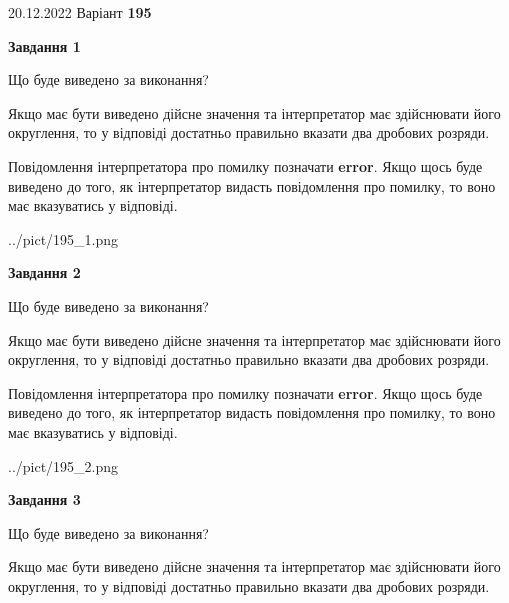 \documentclass[12pt, ukrainian]{article}
\begin{document}
{20.12.2022 Варіант \No \textbf { 195 }\par}
{
\begin {Large}

{\begin {center}\textbf{Завдання 1}\end {center}}\par
Що буде виведено за виконання? \par

Якщо має бути виведено дійсне значення та інтерпретатор має здійснювати його округлення, 
то у відповіді достатньо правильно вказати два дробових розряди.

Повідомлення інтерпретатора про помилку позначати \textbf{error}.
Якщо щось буде виведено до того, як інтерпретатор видасть повідомлення про помилку, 
то воно має вказуватись у відповіді. \par

\begin{center}
	{../pict/195_1.png}
\end{center}
\newpage

{\begin {center}\textbf{Завдання 2}\end {center}}\par
Що буде виведено за виконання? \par

Якщо має бути виведено дійсне значення та інтерпретатор має здійснювати його округлення, 
то у відповіді достатньо правильно вказати два дробових розряди.

Повідомлення інтерпретатора про помилку позначати \textbf{error}.
Якщо щось буде виведено до того, як інтерпретатор видасть повідомлення про помилку, 
то воно має вказуватись у відповіді. \par

\begin{center}
	{../pict/195_2.png}
\end{center}
\newpage

{\begin {center}\textbf{Завдання 3}\end {center}}\par
Що буде виведено за виконання? \par

Якщо має бути виведено дійсне значення та інтерпретатор має здійснювати його округлення, 
то у відповіді достатньо правильно вказати два дробових розряди.


\end{Large}}
\end{document}
